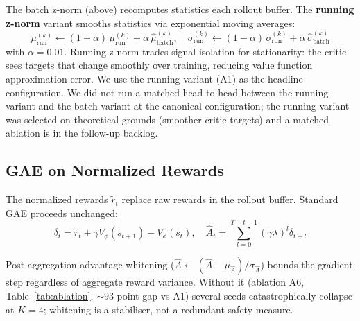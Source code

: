 \documentclass[11pt,a4paper]{article}
\begin{document}
The batch z-norm (above) recomputes statistics each rollout buffer. The \textbf{running z-norm} variant smooths statistics via exponential moving averages:
\begin{equation}
\mu_{\text{run}}^{(k)} \leftarrow (1-\alpha)\,\mu_{\text{run}}^{(k)} + \alpha\,\hat{\mu}_{\text{batch}}^{(k)}, \quad
\sigma_{\text{run}}^{(k)} \leftarrow (1-\alpha)\,\sigma_{\text{run}}^{(k)} + \alpha\,\hat{\sigma}_{\text{batch}}^{(k)}
\end{equation}
with $\alpha = 0.01$. Running z-norm trades signal isolation for stationarity: the critic sees targets that change smoothly over training, reducing value function approximation error. We use the running variant (A1) as the headline configuration. We did not run a matched head-to-head between the running variant and the batch variant at the canonical configuration; the running variant was selected on theoretical grounds (smoother critic targets) and a matched ablation is in the follow-up backlog.

\subsection{GAE on Normalized Rewards}

The normalized rewards $\tilde{r}_t$ replace raw rewards in the rollout buffer. Standard GAE proceeds unchanged:
\begin{equation}
\delta_t = \tilde{r}_t + \gamma V_\phi(s_{t+1}) - V_\phi(s_t), \quad \hat{A}_t = \sum_{l=0}^{T-t-1} (\gamma\lambda)^l \delta_{t+l}
\end{equation}

Post-aggregation advantage whitening ($\hat{A} \leftarrow (\hat{A} - \mu_{\hat{A}}) / \sigma_{\hat{A}}$) bounds the gradient step regardless of aggregate reward variance. Without it (ablation A6, Table~\ref{tab:ablation}, ${\sim}93$-point gap vs A1) several seeds catastrophically collapse at $K{=}4$; whitening is a stabiliser, not a redundant safety measure.
\end{document}

